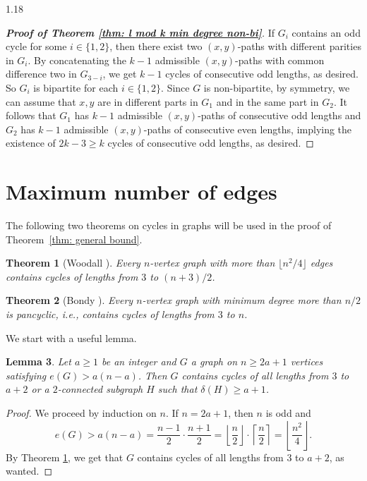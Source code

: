 \documentclass[10pt]{article}
\newtheorem{theorem}{Theorem}[section]
\newtheorem{lemma}[theorem]{Lemma}
\let\geq\geqslant
\begin{document}
\begin{spacing}{1.18}
\begin{proof}[\bf Proof of Theorem \ref{thm: l mod k min degree non-bi}]
    If $G_i$ contains an odd cycle for some $i\in \{1,2\}$, then there exist two $(x,y)$-paths with different parities in $G_i$. By concatenating the $k-1$ admissible $(x,y)$-paths with common difference two in $G_{3-i}$, we get $k-1$ cycles of consecutive odd lengths, as desired. So $G_i$ is bipartite for each $i\in \{1,2\}$. Since $G$ is non-bipartite, by symmetry, we can assume that $x,y$ are in different parts in $G_1$ and in the same part in $G_2$. It follows that $G_1$ has $k-1$ admissible $(x,y)$-paths of consecutive odd lengths and $G_2$ has $k-1$ admissible $(x,y)$-paths of consecutive even lengths, implying the existence of $2k-3\geqslant k$ cycles of consecutive odd lengths, as desired. 
\end{proof}



\section{Maximum number of edges}\label{section: edge bound}


The following two theorems on cycles in graphs will be used in the proof of Theorem~\ref{thm: general bound}.

\begin{theorem}[Woodall \cite{W72}]\label{thm: (n+3)/2}
    Every $n$-vertex graph with more than $\lfloor n^2/4\rfloor$ edges contains cycles of lengths from $3$ to $(n+3)/2$.
\end{theorem}

\begin{theorem}[Bondy \cite{Bon71}]\label{thm: pancyclic}
    Every $n$-vertex graph with minimum degree more than $n/2$ is pancyclic, i.e., contains cycles of lengths from $3$ to $n$.
\end{theorem}

We start with a useful lemma. 

\begin{lemma}\label{lem: from edge number to degree}
Let $a\geq 1$ be an integer and $G$ a graph on $n \geq 2a+1$ vertices satisfying $e(G) > a(n-a)$. Then $G$ contains cycles of all lengths from $3$ to $a+2$ or a $2$-connected subgraph $H$ such that $\delta(H) \geq a+1$. 
\end{lemma}

\begin{proof}
    We proceed by induction on $n$. If $n=2a+1$, then $n$ is odd and
   \[
     e(G)>a(n-a)
     =\frac{n-1}{2}\cdot \frac{n+1}{2}
     =\left\lfloor\frac{n}{2}\right\rfloor \cdot \left\lceil\frac{n}{2}\right\rceil
     =\left\lfloor\frac{n^2}{4}\right\rfloor.
   \]
   By Theorem \ref{thm: (n+3)/2}, we get that $G$ contains cycles of all lengths from $3$ to $a+2$, as wanted. 
   

\end{proof}
\end{spacing}
\end{document}

